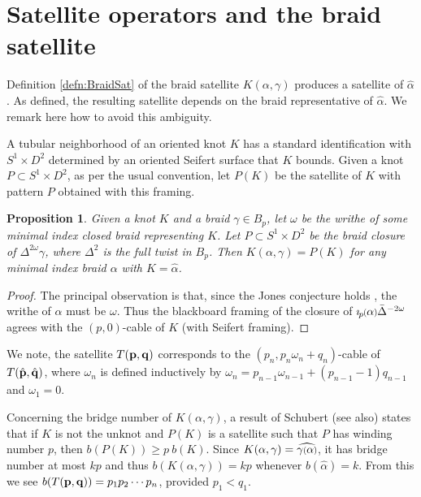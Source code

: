 \documentclass[11pt]{amsart}
\newcommand*{\smallp}[1]{\scalebox{.75}{\ensuremath#1}}
\newcommand{\pp}[2][p]{\imath_{\hspace*{-1pt}#1}\hspace*{-.5pt}\smallp(#2\smallp)}
\newtheorem{prop}[thm]{Proposition}
\theoremstyle{definition}
\begin{document}
\section{Satellite operators and the braid satellite}
\label{SecAsSatelliteOp}

Definition \ref{defn:BraidSat} of the braid satellite $K(\alpha,\gamma)$ produces a satellite of $\hat{\alpha}$. As defined, the resulting satellite depends on the braid representative of $\hat{\alpha}$. We remark here how to avoid this ambiguity.

A tubular neighborhood of an oriented knot $K$ has a standard identification with $S^1\times D^2$ determined by an oriented Seifert surface that $K$ bounds. Given a knot $P\subset S^1\times D^2$, as per the usual convention, let $P(K)$ be the satellite of $K$ with pattern $P$ obtained with this framing.

\begin{prop}\label{PropAsSatelliteOp}Given a knot $K$ and a braid $\gamma\in B_p$, let $\omega$ be the writhe of some minimal index closed braid representing $K$. Let $P\subset S^1\times D^2$ be the braid closure of $\Delta^{2\omega}\gamma$, where $\Delta^2$ is the full twist in $B_p$. Then $K(\alpha,\gamma) = P(K)$ for any minimal index braid $\alpha$ with $K=\hat{\alpha}$.
\end{prop}
\begin{proof}The principal observation is that, since the Jones conjecture holds \cite{DP12,LM12}, the writhe of $\alpha$ must be $\omega$. Thus the blackboard framing of the closure of $\pp\alpha\bar\Delta^{-2\omega}$ agrees with the $(p,0)$-cable of $K$ (with Seifert framing).
\end{proof}

We note, the satellite $T({\bf p},{\bf q})$ corresponds to the $(p_n,p_n\omega_n+q_n)$-cable of $T(\hat{\bf p},\hat{\bf q})$, where $\omega_n$ is defined inductively by $\omega_n=p_{n-1}\omega_{n-1}+(p_{n-1}-1)q_{n-1}$ and $\omega_1=0$.

Concerning the bridge number of $K(\alpha,\gamma)$, a result of Schubert \cite{Schub} (see \cite{Schul} also) states that if $K$ is not the unknot and $P(K)$ is a satellite such that $P$ has winding number $p$, then $b(P(K)) \ge p\ b(K)$. Since $K(\alpha,\gamma) = \widehat{\gamma\smallp(\alpha\smallp)}$, it has bridge number at most $kp$ and thus $b(K(\alpha,\gamma)) = kp$ whenever $b(\hat\alpha) = k$. From this we see $b(T({\bf p},{\bf q})) = p_1p_2\cdots p_n$, provided $p_1 < q_1$.
\end{document}
